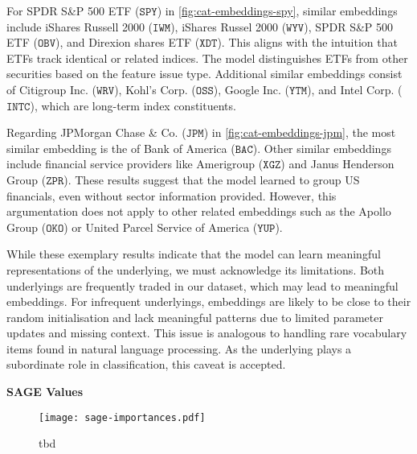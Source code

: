For SPDR S\&P 500 ETF ($\mathtt{SPY}$) in \cref{fig:cat-embeddings-spy}, similar embeddings include iShares Russell 2000 ($\mathtt{IWM}$), iShares Russel 2000 ($\mathtt{WYV}$), SPDR S\&P 500 ETF ($\mathtt{OBV}$), and Direxion shares ETF ($\mathtt{XDT}$). This aligns with the intuition that \glspl{ETF} track identical or related indices. The model distinguishes \glspl{ETF} from other securities based on the feature issue type. Additional similar embeddings consist of Citigroup Inc. ($\mathtt{WRV}$), Kohl's Corp. ($\mathtt{OSS}$), Google Inc. ($\mathtt{YTM}$), and Intel Corp. ($\mathtt{INTC}$), which are long-term index constituents.

Regarding JPMorgan Chase \& Co. ($\mathtt{JPM}$) in \cref{fig:cat-embeddings-jpm}, the most similar embedding is the of Bank of America ($\mathtt{BAC}$). Other similar embeddings include financial service providers like Amerigroup ($\mathtt{XGZ}$) and Janus Henderson Group ($\mathtt{ZPR}$). These results suggest that the model learned to group US financials, even without sector information provided. However, this argumentation does not apply to other related embeddings such as the Apollo Group ($\mathtt{OKO}$) or United Parcel Service of America ($\mathtt{YUP}$). %

While these exemplary results indicate that the model can learn meaningful representations of the underlying, we must acknowledge its limitations. Both underlyings are frequently traded in our dataset, which may lead to meaningful embeddings. For infrequent underlyings, embeddings are likely to be close to their random initialisation and lack meaningful patterns due to limited parameter updates and missing context. This issue is analogous to handling rare vocabulary items found in natural language processing. As the underlying plays a subordinate role in classification, this caveat is accepted.

\textbf{SAGE Values}

\begin{figure}[h!]
    \centering
    \texttt{[image: sage-importances.pdf]}
    \caption[tbd]{tbd}
    \label{fig:sage-importances}
\end{figure}


